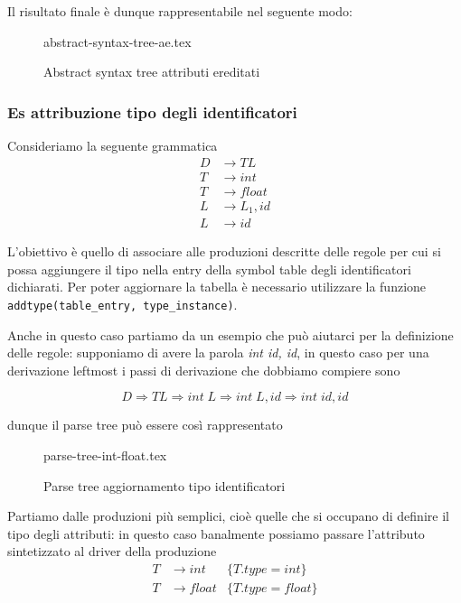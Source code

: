 \documentclass[class=book, crop=false, oneside, 12pt]{standalone}
\begin{document}
Il risultato finale è dunque rappresentabile nel seguente modo:

\begin{figure}[H]
	\centering
    {abstract-syntax-tree-ae.tex}
    \caption{Abstract syntax tree attributi ereditati}
    \label{fig:abstract-syntax-tree-ae}
\end{figure}

\subsubsection{Es attribuzione tipo degli identificatori}

Consideriamo la seguente grammatica
\begin{align*}
    D &\to TL \\
    T &\to int \\
    T &\to float \\
    L &\to L_1, id \\
    L &\to id
\end{align*}

L'obiettivo è quello di associare alle produzioni descritte delle regole per cui si possa aggiungere il tipo nella entry della symbol table degli identificatori dichiarati. Per poter aggiornare la tabella è necessario utilizzare la funzione \texttt{addtype(table\_entry, type\_instance)}.

Anche in questo caso partiamo da un esempio che può aiutarci per la definizione delle regole: supponiamo di avere la parola \emph{int id, id}, in questo caso per una derivazione leftmost i passi di derivazione che dobbiamo compiere sono

\begin{equation*}
    D \Rightarrow TL \Rightarrow int\; L \Rightarrow int\; L, id \Rightarrow int\; id, id
\end{equation*}

dunque il parse tree può essere così rappresentato

\begin{figure}[H]
	\centering
    {parse-tree-int-float.tex}
    \caption{Parse tree aggiornamento tipo identificatori}
    \label{fig:parse-tree-int-float}
\end{figure}

Partiamo dalle produzioni più semplici, cioè quelle che si occupano di definire il tipo degli attributi: in questo caso banalmente possiamo passare l'attributo sintetizzato al driver della produzione
\begin{align*}
    T &\to int &\{T.type = int\} \\
    T &\to float &\{T.type = float\}
\end{align*}
\end{document}
